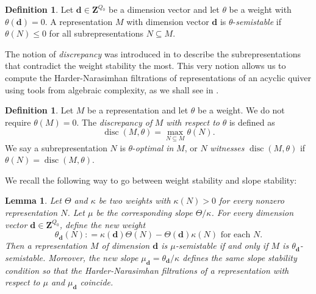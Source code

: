 \documentclass[a4paper]{amsart}
\numberwithin{equation}{section}
\theoremstyle{plain}
\newtheorem{lemma}[theorem]{Lemma}
\theoremstyle{definition}
\newtheorem{definition}[theorem]{Definition}
\DeclareMathOperator{\Rep}{Rep}
\DeclareMathOperator{\GL}{GL}
\DeclareMathOperator{\disc}{disc}
\begin{document}

\begin{definition}\label{weight_stability_def}
Let $\mathbf{d}\in\mathbf{Z}^{Q_0}$ be a dimension vector and let $\theta$ be a weight with $\theta(\mathbf{d})=0$. A representation $M$ with dimension vector $\mathbf{d}$ is $\theta$-\emph{semistable} if $\theta(N)\leq 0$ for all subrepresentations $N\subseteq M$. 
\end{definition}

The notion of \emph{discrepancy} was introduced in \cite{MR4238986} to describe the subrepresentations that contradict the weight stability the most. This very notion allows us to compute the  Harder-Narasimhan filtrations of representations of an acyclic quiver using tools from algebraic complexity, as we shall see in .

\begin{definition}\label{discrepancy}
Let $M$ be a representation and let $\theta$ be a weight. We do not require $\theta(M)=0$. 
The \emph{discrepancy of }$M$ \emph{with respect to} $\theta$ is defined as 
$$\disc(M,\theta)=\max_{N\subseteq M}\theta(N).$$ We say a subrepresentation $N$ is $\theta$-\emph{optimal in }$M$, or $N$ \emph{witnesses} $\disc(M,\theta)$ if $\theta(N)=\disc(M,\theta)$.
\end{definition}

We recall the following way to go between weight stability and slope stability:
\begin{lemma}\label{connecting_slope_weight_stability}
Let $\Theta$ and $\kappa$ be two weights with $\kappa(N)> 0$ for every nonzero representation $N$. Let $\mu$ be the corresponding slope $\Theta/\kappa$. For every dimension vector $\mathbf{d}\in\mathbf{Z}^{Q_0}$, define the new weight $$\theta_{\mathbf{d}}(N): =\kappa(\mathbf{d})\Theta(N)-\Theta(\mathbf{d})\kappa(N)\text{ for each }N.$$ Then a representation $M$ of dimension $\mathbf{d}$ is $\mu$-semistable if and only if $M$ is $\theta_{\mathbf{d}}$-semistable. Moreover, the new slope $\mu_{\mathbf{d}}=\theta_{\mathbf{d}}/\kappa$ defines the same slope stability condition so that the Harder-Narasimhan filtrations of a representation with respect to $\mu$ and $\mu_{\mathbf{d}}$ coincide.
\end{lemma}
\end{document}
